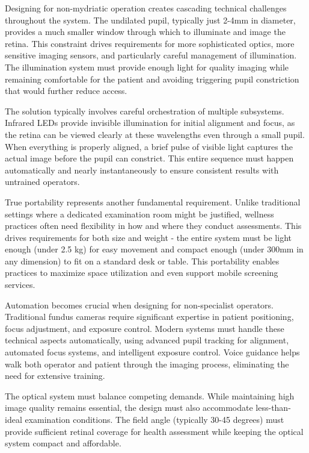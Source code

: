 \documentclass[
  Letterpaper,
]{scrbook}
\begin{document}
Designing for non-mydriatic operation creates cascading technical
challenges throughout the system. The undilated pupil, typically just
2-4mm in diameter, provides a much smaller window through which to
illuminate and image the retina. This constraint drives requirements for
more sophisticated optics, more sensitive imaging sensors, and
particularly careful management of illumination. The illumination system
must provide enough light for quality imaging while remaining
comfortable for the patient and avoiding triggering pupil constriction
that would further reduce access.

The solution typically involves careful orchestration of multiple
subsystems. Infrared LEDs provide invisible illumination for initial
alignment and focus, as the retina can be viewed clearly at these
wavelengths even through a small pupil. When everything is properly
aligned, a brief pulse of visible light captures the actual image before
the pupil can constrict. This entire sequence must happen automatically
and nearly instantaneously to ensure consistent results with untrained
operators.

True portability represents another fundamental requirement. Unlike
traditional settings where a dedicated examination room might be
justified, wellness practices often need flexibility in how and where
they conduct assessments. This drives requirements for both size and
weight - the entire system must be light enough (under 2.5 kg) for easy
movement and compact enough (under 300mm in any dimension) to fit on a
standard desk or table. This portability enables practices to maximize
space utilization and even support mobile screening services.

Automation becomes crucial when designing for non-specialist operators.
Traditional fundus cameras require significant expertise in patient
positioning, focus adjustment, and exposure control. Modern systems must
handle these technical aspects automatically, using advanced pupil
tracking for alignment, automated focus systems, and intelligent
exposure control. Voice guidance helps walk both operator and patient
through the imaging process, eliminating the need for extensive
training.

The optical system must balance competing demands. While maintaining
high image quality remains essential, the design must also accommodate
less-than-ideal examination conditions. The field angle (typically 30-45
degrees) must provide sufficient retinal coverage for health assessment
while keeping the optical system compact and affordable.
\end{document}
